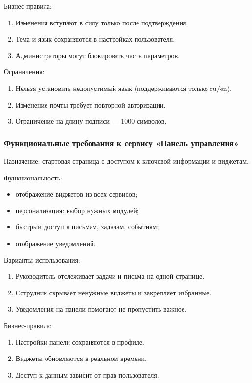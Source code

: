 Бизнес-правила:
\begin{enumerate}
  \item Изменения вступают в силу только после подтверждения.
  \item Тема и язык сохраняются в настройках пользователя.
  \item Администраторы могут блокировать часть параметров.
\end{enumerate}

Ограничения:
\begin{enumerate}
  \item Нельзя установить недопустимый язык (поддерживаются только ru/en).
  \item Изменение почты требует повторной авторизации.
  \item Ограничение на длину подписи — 1000 символов.
\end{enumerate}

\subsubsection{Функциональные требования к сервису «Панель управления»}

Назначение: стартовая страница с доступом к ключевой информации и виджетам.

Функциональность:
\begin{itemize}
  \item отображение виджетов из всех сервисов;
  \item персонализация: выбор нужных модулей;
  \item быстрый доступ к письмам, задачам, событиям;
  \item отображение уведомлений.
\end{itemize}

Варианты использования:
\begin{enumerate}
  \item Руководитель отслеживает задачи и письма на одной странице.
  \item Сотрудник скрывает ненужные виджеты и закрепляет избранные.
  \item Уведомления на панели помогают не пропустить важное.
\end{enumerate}

Бизнес-правила:
\begin{enumerate}
  \item Настройки панели сохраняются в профиле.
  \item Виджеты обновляются в реальном времени.
  \item Доступ к данным зависит от прав пользователя.
\end{enumerate}


